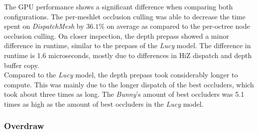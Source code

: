 \noindent
The \ac{GPU} performance shows a significant difference when comparing both configurations. The per-meshlet 
occlusion culling was able to decrease the time spent on \emph{DispatchMesh} by $36.1\%$ on average as compared 
to the per-octree node occlusion culling. On closer inspection, the depth prepass showed a minor difference 
in runtime, similar to the prepass of the \emph{Lucy} model. The difference in runtime is 1.6 microseconds, 
mostly due to differences in \ac{HiZ} dispatch and depth buffer copy. \\

\noindent
Compared to the \emph{Lucy} model, the depth prepass took considerably longer to compute. This was mainly due to 
the longer dispatch of the best occluders, which took about three times as long. The \emph{Bunny}'s amount of 
best occluders was 5.1 times as high as the amount of best occluders in the \emph{Lucy} model.

\subsubsection*{Overdraw} \label{subsubsec-overdraw-bunny}

